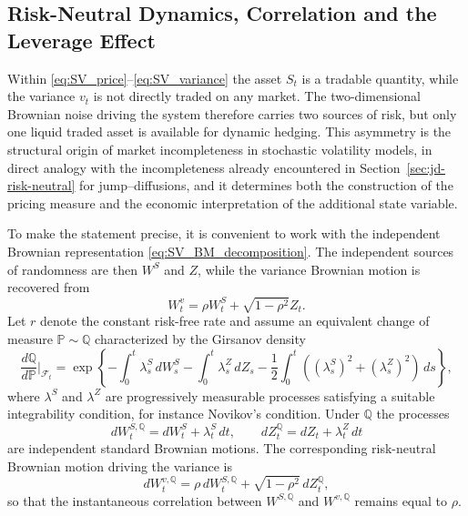 \subsection{Risk-Neutral Dynamics, Correlation and the Leverage Effect}


Within \eqref{eq:SV_price}--\eqref{eq:SV_variance} the asset $S_t$ is a
tradable quantity, while the variance $v_t$ is not directly traded on
any market. The two-dimensional Brownian noise driving the system
therefore carries two sources of risk, but only one liquid traded asset
is available for dynamic hedging. This asymmetry is the structural origin
of market incompleteness in stochastic volatility models, in direct
analogy with the incompleteness already encountered in Section~\ref{sec:jd-risk-neutral} for
jump--diffusions, and it determines both the construction of the pricing
measure and the economic interpretation of the additional state variable.

To make the statement precise, it is convenient to work with the
independent Brownian representation \eqref{eq:SV_BM_decomposition}. The
independent sources of randomness are then $W^{S}$ and $Z$, while the
variance Brownian motion is recovered from
\[
W^{v}_t
=
\rho W^{S}_t+\sqrt{1-\rho^2}Z_t.
\]
Let $r$ denote the constant risk-free rate and assume an equivalent
change of measure $\mathbb{P}\sim\mathbb{Q}$ characterized by the
Girsanov density
\begin{equation}\label{eq:SV_girsanov}
\frac{d\mathbb{Q}}{d\mathbb{P}}\bigg|_{\mathcal{F}_t}
=
\exp\!\left\{
-\int_0^t \lambda^S_s\,dW^S_s
-\int_0^t \lambda^Z_s\,dZ_s
-\frac12\int_0^t
\left((\lambda^S_s)^2+(\lambda^Z_s)^2\right)\,ds
\right\},
\end{equation}
where $\lambda^S$ and $\lambda^Z$ are progressively measurable processes
satisfying a suitable integrability condition, for instance Novikov's
condition. Under $\mathbb{Q}$ the processes
\begin{equation}
dW^{S,\mathbb{Q}}_t
=
dW^{S}_t+\lambda^S_t\,dt,
\qquad
dZ^{\mathbb{Q}}_t
=
dZ_t+\lambda^Z_t\,dt
\end{equation}
are independent standard Brownian motions. The corresponding
risk-neutral Brownian motion driving the variance is
\begin{equation}
dW^{v,\mathbb{Q}}_t
=
\rho\,dW^{S,\mathbb{Q}}_t
+
\sqrt{1-\rho^2}\,dZ^{\mathbb{Q}}_t,
\end{equation}
so that the instantaneous correlation between $W^{S,\mathbb{Q}}$ and
$W^{v,\mathbb{Q}}$ remains equal to $\rho$.

